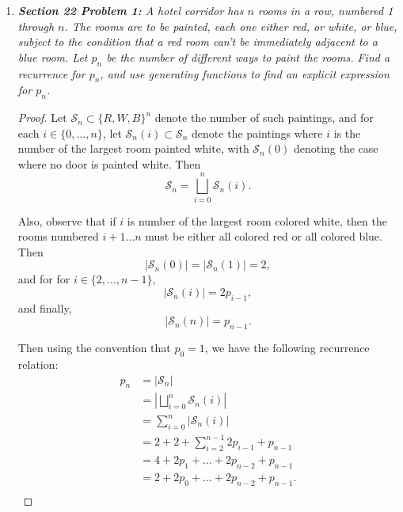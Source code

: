 \documentclass{article}
\begin{document}
\begin{enumerate}[label={\bf Q\arabic*:}]
  \item \it \textbf{Section 22 Problem 1:} A hotel corridor has $n$ rooms
    in a row, numbered 1 through $n$. The rooms are to be painted, each one
    either red, or white, or blue, subject to the condition that a red room
    can't be immediately adjacent to a blue room. Let $p_n$ be the number
    of different ways to paint the rooms. Find a recurrence for $p_n$, and
    use generating functions to find an explicit expression for $p_n$.

    \begin{proof}
      Let $\mathcal{S}_n\subset\{R,W,B\}^n$ denote the number of such
      paintings, and for each $i\in\{0,\ldots,n\}$, let
      $\mathcal{S}_n(i)\subset\mathcal{S}_n$ denote the paintings where $i$
      is the number of the largest room painted white, with
      $\mathcal{S}_n(0)$ denoting the case where no door is painted white.
      Then
      \[\mathcal{S}_n =\bigsqcup_{i=0}^n \mathcal{S}_n(i).\]

      Also, observe that if $i$ is number of the largest room colored
      white, then the rooms numbered $i+1\ldots n$ must be either all
      colored red or all colored blue. Then
      \[|\mathcal{S}_n(0)|=|\mathcal{S}_n(1)|=2,\]
      and for for $i\in\{2,\ldots,n-1\}$,
      \[|\mathcal{S}_n(i)| =2p_{i-1},\]
      and finally,
      \[|\mathcal{S}_n(n)| =p_{n-1}.\]

      Then using the convention that $p_0=1$, we have the following
      recurrence relation:
      \begin{align*}
        p_n &=|\mathcal{S}_n|\\
        &=\left|\bigsqcup_{i=0}^n \mathcal{S}_n(i)\right|\\
        &=\sum_{i=0}^n|\mathcal{S}_n(i)|\\
        &=2+2+\sum_{i=2}^{n-1} 2p_{i-1}+p_{n-1}\\
        &=4+2p_1+\ldots+2p_{n-2}+p_{n-1}\\
        &=2+2p_0+\ldots+2p_{n-2}+p_{n-1}.\\
      \end{align*}


\end{proof}
\end{enumerate}
\end{document}
